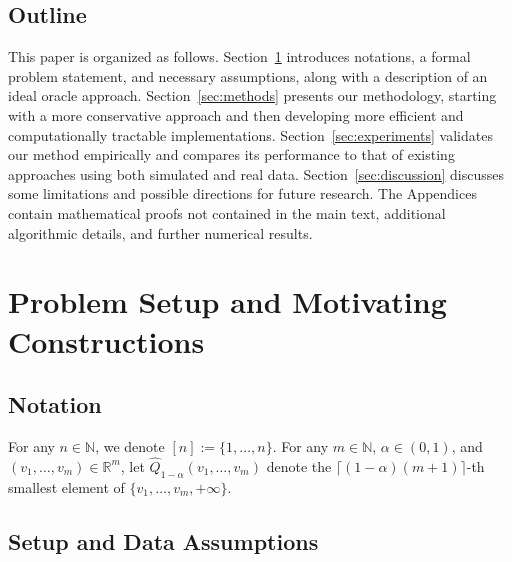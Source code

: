 \subsection{Outline}

This paper is organized as follows.
Section~\ref{sec:preliminaries} introduces notations, a formal problem statement, and necessary assumptions, along with a description of an ideal oracle approach.
Section~\ref{sec:methods} presents our methodology, starting with a more conservative approach and then developing more efficient and computationally tractable implementations.
Section~\ref{sec:experiments} validates our method empirically and compares its performance to that of existing approaches using both simulated and real data.
Section~\ref{sec:discussion} discusses some limitations and possible directions for future research.
The Appendices contain mathematical proofs not contained in the main text, additional algorithmic details, and further numerical results.
 
\section{Problem Setup and Motivating Constructions}
\label{sec:preliminaries}

\subsection{Notation}

For any $n \in \mathbb{N}$, we denote $[n] := \{1,\ldots,n\}$.
For any $m\in\mathbb{N}$, $\alpha\in(0,1)$, and
$(v_1,\ldots,v_m)\in\mathbb{R}^m$, let
$\widehat Q_{1-\alpha}(v_1,\ldots,v_m)$
denote the $\lceil(1-\alpha)(m+1)\rceil$-th smallest element of
$\{v_1,\ldots,v_m,+\infty\}$.

\subsection{Setup and Data Assumptions}

